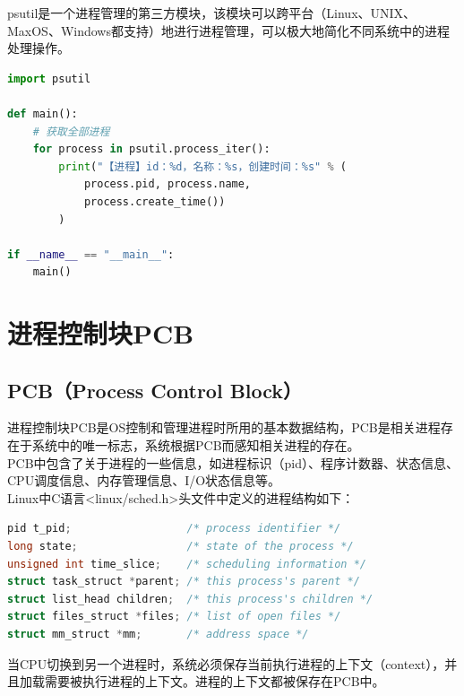 psutil是一个进程管理的第三方模块，该模块可以跨平台（Linux、UNIX、MaxOS、Windows都支持）地进行进程管理，可以极大地简化不同系统中的进程处理操作。\\


\begin{lstlisting}[language=Python]
import psutil

def main():
	# 获取全部进程
	for process in psutil.process_iter():
		print("【进程】id：%d，名称：%s，创建时间：%s" % (
			process.pid, process.name,
			process.create_time())
		)

if __name__ == "__main__":
	main()
\end{lstlisting}

\newpage

\section{进程控制块PCB}

\subsection{PCB（Process Control Block）}

进程控制块PCB是OS控制和管理进程时所用的基本数据结构，PCB是相关进程存在于系统中的唯一标志，系统根据PCB而感知相关进程的存在。\\

PCB中包含了关于进程的一些信息，如进程标识（pid）、程序计数器、状态信息、CPU调度信息、内存管理信息、I/O状态信息等。\\

Linux中C语言<linux/sched.h>头文件中定义的进程结构如下：\\


\begin{lstlisting}[language=C]
pid t_pid;					/* process identifier */
long state;					/* state of the process */
unsigned int time_slice;	/* scheduling information */
struct task_struct *parent;	/* this process's parent */
struct list_head children;	/* this process's children */
struct files_struct *files;	/* list of open files */
struct mm_struct *mm;		/* address space */
\end{lstlisting}

当CPU切换到另一个进程时，系统必须保存当前执行进程的上下文（context），并且加载需要被执行进程的上下文。进程的上下文都被保存在PCB中。

\newpage

